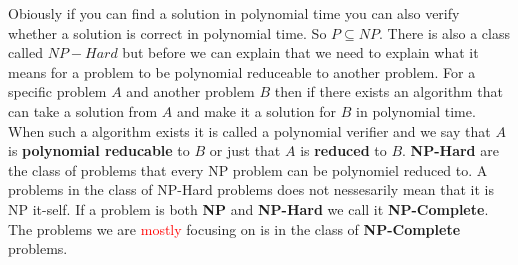 Obiously if you can find a solution in polynomial time you can also verify whether a solution is correct in polynomial time. 
So $P\subseteq NP$. 
There is also a class called $NP-Hard$ but before we can explain that we need to explain what it means for a problem to be polynomial reduceable to another problem. 
For a specific problem $A$ and another problem $B$ then if there exists an algorithm that can take a solution from $A$ and make it a solution for $B$ in polynomial time. 
When such a algorithm exists it is called a polynomial verifier and we say that $A$ is \textbf{polynomial reducable} to $B$ or just that $A$ is \textbf{reduced} to $B$. 
\textbf{NP-Hard} are the class of problems that every NP problem can be polynomiel reduced to. 
A problems in the class of NP-Hard problems does not nessesarily mean that it is NP it-self.
If a problem is both \textbf{NP} and \textbf{NP-Hard} we call it \textbf{NP-Complete}. 
The problems we are \textcolor{red}{mostly} focusing on is in the class of \textbf{NP-Complete} problems.   

